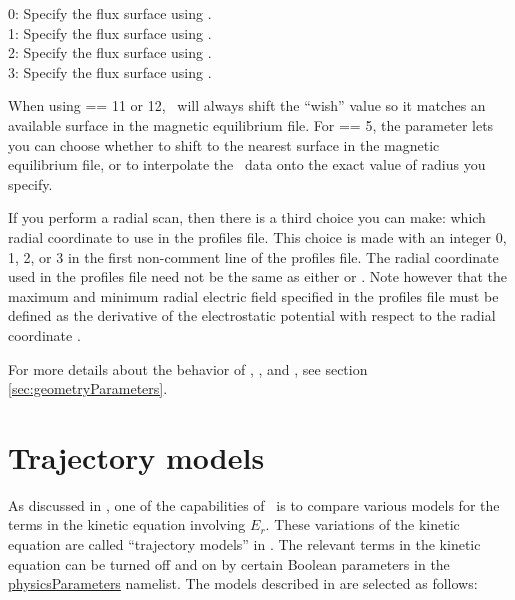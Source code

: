 {\setlength{\parindent}{0cm}

0: Specify the flux surface using .\\

1: Specify the flux surface using .\\

2: Specify the flux surface using .\\

3: Specify the flux surface using .\\

}

When using  == 11 or 12, \sfincs~will always shift the ``wish'' value so it matches an available surface in the magnetic equilibrium file.
For  == 5, the  parameter lets you can choose whether to shift to the nearest surface in the magnetic equilibrium file,
or to interpolate the \vmec~data onto the exact value of radius you specify.

If you perform a radial scan, then there is a third choice you can make: which radial coordinate to use in the {\ttfamily profiles} file.
This choice is made with an integer 0, 1, 2, or 3 in the first non-comment line of the {\ttfamily profiles} file.
The radial coordinate used in the {\ttfamily profiles} file need not be the same as either
 or .
Note however that the maximum and minimum radial electric field specified in the {\ttfamily profiles}
file must be defined as the derivative of the electrostatic potential with respect to the radial coordinate .

For more details about the behavior of , , and ,
see section \ref{sec:geometryParameters}.

\section{Trajectory models}

As discussed in \cite{sfincsPaper},
one of the capabilities of \sfincs~is to compare various models for the terms in the kinetic equation involving $E_r$.
These variations of the kinetic equation are called ``trajectory models'' in \cite{sfincsPaper}.
The relevant terms in the kinetic equation can be turned off and on by certain Boolean parameters in the {\ttfamily \hyperref[sec:physicsParameters]{physicsParameters}} namelist.
The models described in \cite{sfincsPaper} are selected as follows:\\


